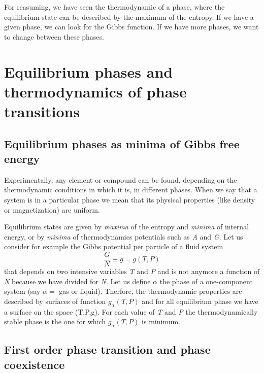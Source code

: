 \documentclass[../main/main.tex]{subfiles}
\begin{document}
For reasuming, we have seen the thermodynamic of a phase, where the equilibrium state can be described by the maximum of the entropy. If we have a given phase, we can look for the Gibbs function. If we have more phases, we want to change between these phases.















\chapter{Equilibrium phases and thermodynamics of phase transitions}


\section{Equilibrium phases as minima of Gibbs free energy}

Experimentally, any element or compound can be found, depending on the thermodynamic conditions in which it is, in different phases. When we say that a system is in a particular phase we mean that its physical properties (like density or magnetization) are uniform.

Equilibrium states are given by \emph{maxima} of the entropy and \emph{minima} of internal energy, or by \emph{minima} of thermodynamics potentials such as \emph{A} and \emph{G}.
Let us consider for example the Gibbs potential per particle of a fluid system
\begin{equation}
  \frac{G}{N} \equiv g = g (T,P)
  \label{eq:}
\end{equation}
  that depends on two intensive variables \emph{T} and \emph{P} and is not anymore a function of \emph{N} because we have divided for \emph{N}.
  Let us define \( \alpha  \) the phase of a one-component system (say \( \alpha = \) gas or liquid). Therfore, the thermodynamic properties are described by surfaces of function \( g_\alpha (T,P) \) and for all equilibrium phase we have a surface on the space (T,P,g). For each value of \emph{T} and \emph{P} the thermodynamically stable phase is the one for which \( g_ \alpha (T,P) \) is minimum.

\section{First order phase transition and phase coexistence}
\end{document}
